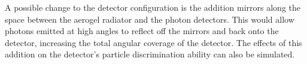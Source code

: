 A possible change to the detector configuration is the addition mirrors along the space between the aerogel radiator and the photon detectors. This would allow photons emitted at high angles to reflect off the mirrors and back onto the detector, increasing the total angular coverage of the detector. The effects of this addition on the detector's particle discrimination ability can also be simulated.




\endinput

Any text after an \endinput is ignored.
You could put scraps here or things in progress.
